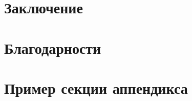\documentclass[a4paper,12pt]{extarticle}
\begin{document}
\section{Заключение}

\section{Благодарности}

\newpage 
\printbibliography[heading=bibintoc] 


\newpage
\appendix

\section{Пример секции аппендикса}
\end{document}
